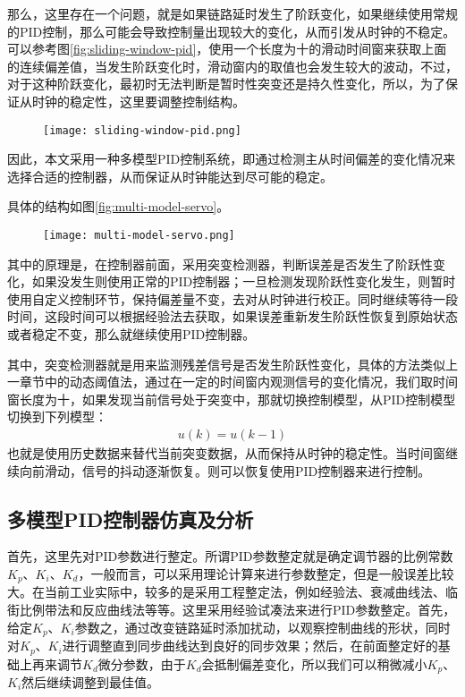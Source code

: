 那么，这里存在一个问题，就是如果链路延时发生了阶跃变化，如果继续使用常规的PID控制，那么可能会导致控制量出现较大的变化，从而引发从时钟的不稳定。可以参考图\ref{fig:sliding-window-pid}，使用一个长度为十的滑动时间窗来获取上面的连续偏差值，当发生阶跃变化时，滑动窗内的取值也会发生较大的波动，不过，对于这种阶跃变化，最初时无法判断是暂时性突变还是持久性变化，所以，为了保证从时钟的稳定性，这里要调整控制结构。
\begin{figure}[htbp]
  \centering
  \begin{minipage}[b]{0.7\textwidth}
   \captionstyle{\centering}
   \centering
   \texttt{[image: sliding-window-pid.png]}
  \end{minipage}     
\end{figure}

因此，本文采用一种多模型PID控制系统，即通过检测主从时间偏差的变化情况来选择合适的控制器，从而保证从时钟能达到尽可能的稳定。

具体的结构如图\ref{fig:multi-model-servo}。
\begin{figure}[htbp]
  \centering
  \begin{minipage}[b]{0.7\textwidth}
   \captionstyle{\centering}
   \centering
   \texttt{[image: multi-model-servo.png]}
  \end{minipage}     
\end{figure}

其中的原理是，在控制器前面，采用突变检测器，判断误差是否发生了阶跃性变化，如果没发生则使用正常的PID控制器；一旦检测发现阶跃性变化发生，则暂时使用自定义控制环节，保持偏差量不变，去对从时钟进行校正。同时继续等待一段时间，这段时间可以根据经验法去获取，如果误差重新发生阶跃性恢复到原始状态或者稳定不变，那么就继续使用PID控制器。

其中，突变检测器就是用来监测残差信号是否发生阶跃性变化，具体的方法类似上一章节中的动态阈值法，通过在一定的时间窗内观测信号的变化情况，我们取时间窗长度为十，如果发现当前信号处于突变中，那就切换控制模型，从PID控制模型切换到下列模型：
\begin {align}
u(k) = u(k-1)
\end{align}
也就是使用历史数据来替代当前突变数据，从而保持从时钟的稳定性。当时间窗继续向前滑动，信号的抖动逐渐恢复。则可以恢复使用PID控制器来进行控制。

\subsection{多模型PID控制器仿真及分析}
首先，这里先对PID参数进行整定。所谓PID参数整定就是确定调节器的比例常数$K_{p}$、$K_{i}$、$K_{d}$，一般而言，可以采用理论计算来进行参数整定，但是一般误差比较大。在当前工业实际中，较多的是采用工程整定法，例如经验法、衰减曲线法、临街比例带法和反应曲线法等等。这里采用经验试凑法来进行PID参数整定。首先，给定$K_{p}$、$K_{i}$参数之，通过改变链路延时添加扰动，以观察控制曲线的形状，同时对$K_{p}$、$K_{i}$进行调整直到同步曲线达到良好的同步效果；然后，在前面整定好的基础上再来调节$K_{d}$微分参数，由于$K_{d}$会抵制偏差变化，所以我们可以稍微减小$K_{p}$、$K_{i}$然后继续调整到最佳值。

